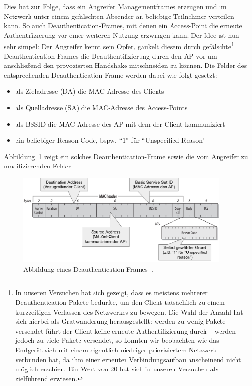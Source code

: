 Dies hat zur Folge, dass ein Angreifer Managementframes erzeugen und im Netzwerk unter einem gefälschten Absender an beliebige Teilnehmer verteilen kann.
So auch Deauthentication-Frames, mit denen ein Access-Point die erneute Authentifizierung vor einer weiteren Nutzung erzwingen kann. Der Idee ist nun sehr simpel: Der Angreifer kennt sein Opfer, gaukelt diesem durch gefälschte\footnote{In unseren Versuchen hat sich gezeigt, dass es meistens mehrerer Deauthentication-Pakete bedurfte, um den Client tatsächlich zu einem kurzzeitigen Verlassen des Netzwerkes zu bewegen. Die Wahl der Anzahl hat sich hierbei als Gratwanderung herausgestellt: werden zu wenig Pakete versendet führt der Client keine erneute Authentifizierung durch -- werden jedoch zu viele Pakete versendet, so konnten wir beobachten wie das Endgerät sich mit einem eigentlich niedriger priorisiertem Netzwerk verbunden hat, da ihm einer erneuter Verbindungsaufbau anscheinend nicht möglich erschien. Ein Wert von 20 hat sich in unseren Versuchen als zielführend erwiesen.} Deauthentication-Frames die Deauthentifizierung durch den AP vor um anschließend den provozierten Handshake mitschneiden zu können.
Die Felder des entsprechenden Deauthentication-Frame werden dabei wie folgt gesetzt:
\begin{itemize}
	\item als Zieladresse (DA) die MAC-Adresse des Clients
	\item als Quelladresse (SA) die MAC-Adresse des Access-Points
	\item als BSSID die MAC-Adresse des AP mit dem der Client kommuniziert
	\item ein beliebiger Reason-Code, bspw. \enquote{1} für \enquote{Unspecified Reason} \cite[S. 442]{ieee802.11}
\end{itemize}
Abbildung~\ref{fig:deauth-attack} zeigt ein solches Deauthentication-Frame sowie die vom Angreifer zu modifizierenden Felder.

\begin{figure}[ht]
	\centering
	\includegraphics[width=0.95\textwidth]{graphics/deauth-attack}
	\caption[Deauthentication-Frame]{Abbildung eines Deauthentication-Frames~\cite{deauthframe}.}
	\label{fig:deauth-attack}
\end{figure}


